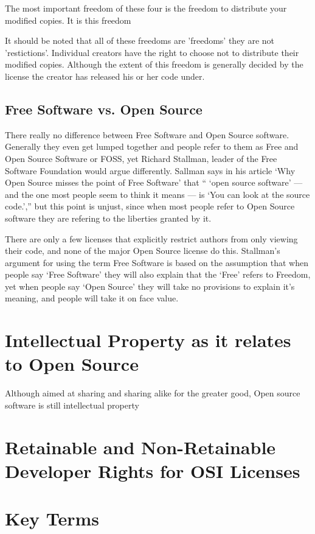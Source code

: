 \documentclass[12pt,letterpaper]{article}
\begin{document}
The most important freedom of these four is the freedom to distribute
your modified copies. It is this freedom

It should be noted that all of these freedoms are 'freedoms' they are
not 'restictions'. Individual creators have the right to choose not to
distribute their modified copies. Although the extent of this freedom is
generally decided by the license the creator has released his or her
code under.

\subsection*{Free Software vs. Open Source}
There really no difference between Free Software and Open Source software.
Generally they even get lumped together and people refer to them as Free and
Open Source Software or FOSS, yet Richard Stallman, leader of the Free Software
Foundation would argue differently. Sallman says in his article `Why Open
Source misses the point of Free Software' that `` `open source software' — and the
one most people seem to think it means — is `You can look at the source
code.','' but this point is unjust, since when most people refer to Open Source
software they are refering to the liberties granted by it. 

There are only a few licenses that explicitly restrict authors from only
viewing their code, and none of the major Open Source license do this.
Stallman's argument for using the term Free Software is based on the assumption
that when people say `Free Software' they will also explain that the `Free'
refers to Freedom, yet when people say `Open Source' they will take no
provisions to explain it's meaning, and people will take it on face value.  

\section*{Intellectual Property as it relates to Open Source}
Although aimed at sharing and sharing alike for the greater good, Open
source software is still intellectual property


\section*{Retainable and Non-Retainable Developer Rights for OSI Licenses}


\section*{Key Terms}
\end{document}
